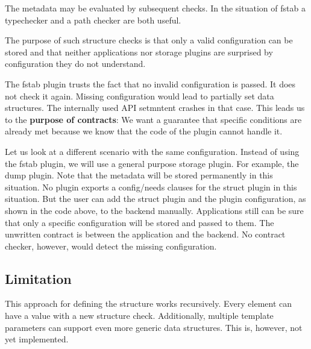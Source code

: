 The metadata may be evaluated by subsequent checks. In the situation of fstab a typechecker and a path checker are both useful.

The purpose of such structure checks is that only a valid configuration can be stored and that neither applications nor storage plugins are surprised by configuration they do not understand.

The fstab plugin trusts the fact that no invalid configuration is passed. It does not check it again. Missing configuration would lead to partially set data structures. The internally used A\+PI {\ttfamily setmntent} crashes in that case. This leads us to the {\bfseries purpose of contracts}\+: We want a guarantee that specific conditions are already met because we know that the code of the plugin cannot handle it.

Let us look at a different scenario with the same configuration. Instead of using the fstab plugin, we will use a general purpose storage plugin. For example, the dump plugin. Note that the metadata will be stored permanently in this situation. No plugin exports a {\ttfamily config/needs} clauses for the struct plugin in this situation. But the user can add the struct plugin and the plugin configuration, as shown in the code above, to the backend manually. Applications still can be sure that only a specific configuration will be stored and passed to them. The unwritten contract is between the application and the backend. No contract checker, however, would detect the missing configuration.

\subsection*{Limitation}

This approach for defining the structure works recursively. Every element can have a value with a new structure check. Additionally, multiple template parameters can support even more generic data structures. This is, however, not yet implemented. 